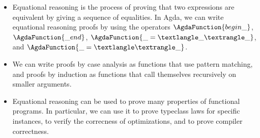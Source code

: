 \documentclass[a4paper,UKenglish]{tufte-handout}
\theoremstyle{definition}
\newcommand\fun[1]{{\AgdaFunction{#1}}}
\begin{document}
\begin{itemize}
  \item Equational reasoning is the process of proving that two
expressions are equivalent by giving a sequence of equalities. In
Agda, we can write equational reasoning proofs by using the operators
$\fun{begin\_}$, $\fun{\_end}$, $\fun{\_=⟨\_⟩\_}$, and
$\fun{\_=⟨⟩\_}$.
  \item We can write proofs by case analysis as functions that use
pattern matching, and proofs by induction as functions that call
themselves recursively on smaller arguments.
  \item Equational reasoning can be used to prove many properties of
functional programs. In particular, we can use it to prove typeclass
laws for specific instances, to verify the correcness of
optimizations, and to prove compiler correctness.
\end{itemize}


%
%
%
%
%
%
%
%
%
%
%
\end{document}
